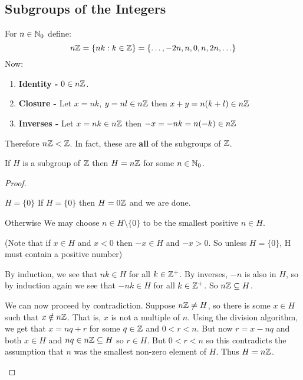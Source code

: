 \documentclass[../main.tex]{subfiles}
\begin{document}
\subsection{Subgroups of the Integers}
\begin{example}
  For $n \in \mathbb{N}_0$ define:
  \[
    n\mathbb{Z} = \{nk : k \in \mathbb{Z}\} = \{\ldots, -2n, n, 0, n, 2n, \ldots\}
  \]
  Now:
  \begin{enumerate}
    \item \textbf{Identity -} $0 \in n\mathbb{Z}$.
    \item \textbf{Closure -} Let $x = nk$, $y = nl \in n\mathbb{Z}$ then $x + y = n(k + l) \in n\mathbb{Z}$
    \item \textbf{Inverses -} Let $x = nk \in n\mathbb{Z}$ then $-x = -nk = n(-k) \in n\mathbb{Z}$
  \end{enumerate}
  Therefore $n\mathbb{Z} < \mathbb{Z}$.
  In fact, these are \textbf{all} of the subgroups of $\mathbb{Z}$.
\end{example}
\begin{proposition}
  If $H$ is a subgroup of $\mathbb{Z}$ then $H = n\mathbb{Z}$ for some $n \in \mathbb{N}_0$.
\end{proposition}
\begin{proof}
  \begin{proofcases}
    \begin{case}{$H = \{0\}$}
      If $H = \{0\}$ then $H = 0\mathbb{Z}$ and we are done.
    \end{case}
    \begin{case}{Otherwise}
      We may choose $n \in H \setminus \{0\}$ to be the smallest positive $n \in H$.

      (Note that if $x \in H$ and $x < 0$ then $-x \in H$ and $-x > 0$. So unless $H = \{0\}$, H must contain a positive number)

      By induction, we see that $nk \in H$ for all $k \in \mathbb{Z}^{+}$.
      By inverses, $-n$ is also in $H$, so by induction again we see that $-nk \in H$ for all $k \in \mathbb{Z}^{+}$.
      So $n\mathbb{Z} \subseteq H$.

      We can now proceed by contradiction.
      Suppose $n\mathbb{Z} \neq H$, so there is some $x \in H$ such that $x \notin n\mathbb{Z}$.
      That is, $x$ is not a multiple of $n$.
      Using the division algorithm, we get that $x = nq + r$ for some $q \in \mathbb{Z}$ and $0 < r < n$.
      But now $r = x - nq$ and both $x \in H$ and $nq \in n\mathbb{Z} \subseteq H$ so $r \in H$.
      But $0 < r < n$ so this contradicts the assumption that $n$ was the smallest non-zero element of $H$.
      Thus $H = n\mathbb{Z}$.
    \end{case}
  \end{proofcases}
\end{proof}
\end{document}
